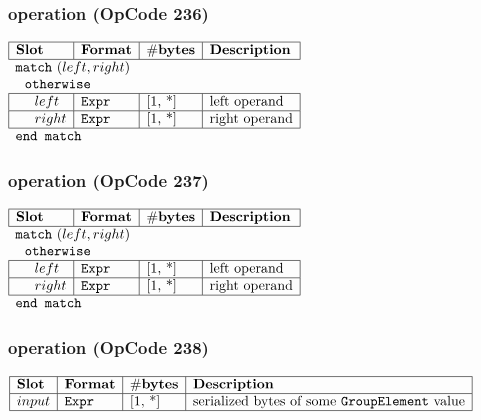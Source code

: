 \subsubsection{ operation (OpCode 236)}

\noindent
\(\begin{array}{| l | l | l | l |}
    \hline
    \bf{Slot} & \bf{Format} & \bf{\#bytes} & \bf{Description} \\
    \hline
        \multicolumn{4}{l}{\lst{match}~(left, right)} \\
         
    \multicolumn{4}{l}{~~\lst{otherwise} } \\
    \hline
            ~~~~ left & \lst{Expr} & \text{[1, *]} & \text{left operand} \\
    \hline
          ~~~~ right & \lst{Expr} & \text{[1, *]} & \text{right operand} \\
    \hline
          \multicolumn{4}{l}{\lst{end match}} \\
\end{array}\)
       

\subsubsection{ operation (OpCode 237)}

\noindent
\(\begin{array}{| l | l | l | l |}
    \hline
    \bf{Slot} & \bf{Format} & \bf{\#bytes} & \bf{Description} \\
    \hline
        \multicolumn{4}{l}{\lst{match}~(left, right)} \\
         
    \multicolumn{4}{l}{~~\lst{otherwise} } \\
    \hline
            ~~~~ left & \lst{Expr} & \text{[1, *]} & \text{left operand} \\
    \hline
          ~~~~ right & \lst{Expr} & \text{[1, *]} & \text{right operand} \\
    \hline
          \multicolumn{4}{l}{\lst{end match}} \\
\end{array}\)
       

\subsubsection{ operation (OpCode 238)}

\noindent
\(\begin{array}{| l | l | l | l |}
    \hline
    \bf{Slot} & \bf{Format} & \bf{\#bytes} & \bf{Description} \\
    \hline
         input & \lst{Expr} & \text{[1, *]} & \text{serialized bytes of some \lst{GroupElement} value} \\
    \hline
      
\end{array}\)
       

